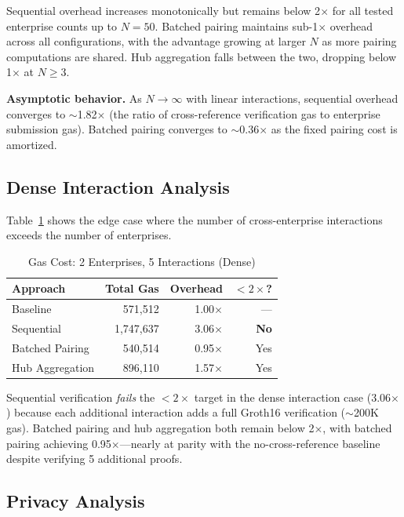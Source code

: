 Sequential overhead increases monotonically but remains below 2$\times$ for
all tested enterprise counts up to $N = 50$. Batched pairing maintains sub-1$\times$
overhead across all configurations, with the advantage growing at larger $N$
as more pairing computations are shared. Hub aggregation falls between the two,
dropping below 1$\times$ at $N \geq 3$.

\textbf{Asymptotic behavior.} As $N \to \infty$ with linear interactions,
sequential overhead converges to $\sim$1.82$\times$ (the ratio of
cross-reference verification gas to enterprise submission gas). Batched
pairing converges to $\sim$0.36$\times$ as the fixed pairing cost is amortized.

\subsection{Dense Interaction Analysis}

Table~\ref{tab:dense} shows the edge case where the number of cross-enterprise
interactions exceeds the number of enterprises.

\begin{table}[htbp]
\centering
\caption{Gas Cost: 2 Enterprises, 5 Interactions (Dense)}
\label{tab:dense}
\begin{tabular}{@{}lrrr@{}}
\toprule
Approach & Total Gas & Overhead & $< 2\times$? \\
\midrule
Baseline & 571,512 & 1.00$\times$ & --- \\
Sequential & 1,747,637 & 3.06$\times$ & \textbf{No} \\
Batched Pairing & 540,514 & 0.95$\times$ & Yes \\
Hub Aggregation & 896,110 & 1.57$\times$ & Yes \\
\bottomrule
\end{tabular}
\end{table}

Sequential verification \emph{fails} the $< 2\times$ target in the dense
interaction case (3.06$\times$) because each additional interaction adds a
full Groth16 verification ($\sim$200K gas). Batched pairing and hub
aggregation both remain below 2$\times$, with batched pairing achieving
0.95$\times$---nearly at parity with the no-cross-reference baseline despite
verifying 5 additional proofs.

\subsection{Privacy Analysis}

